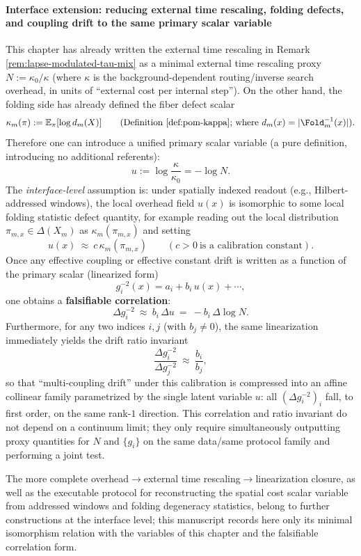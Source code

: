 \paragraph{Interface extension: reducing external time rescaling, folding defects, and coupling drift to the same primary scalar variable}
This chapter has already written the external time rescaling in Remark \ref{rem:lapse-modulated-tau-mix} as a minimal external time rescaling proxy
\(
N:=\kappa_0/\kappa
\)
(where \(\kappa\) is the background-dependent routing/inverse search overhead, in units of ``external cost per internal step'').
On the other hand, the folding side has already defined the fiber defect scalar
\begin{equation}\label{eq:gut_kappa_m_defect}
\kappa_m(\pi):=\mathbb{E}_{\pi}[\log d_m(X)]
\qquad(\text{Definition \ref{def:pom-kappa}; where }d_m(x)=|\Fold_m^{-1}(x)|).
\end{equation}
Therefore one can introduce a unified primary scalar variable (a pure definition, introducing no additional referents):
\[
u:=\log\frac{\kappa}{\kappa_0}=-\log N.
\]
The \emph{interface-level} assumption is: under spatially indexed readout (e.g., Hilbert-addressed windows), the local overhead field \(u(x)\) is isomorphic to some local folding statistic defect quantity,
for example reading out the local distribution \(\pi_{m,x}\in\Delta(X_m)\) as
\(
\kappa_m(\pi_{m,x})
\)
and setting
\[
u(x)\ \approx\ c\,\kappa_m(\pi_{m,x})
\qquad(c>0\ \text{is a calibration constant}).
\]
Once any effective coupling or effective constant drift is written as a function of the primary scalar (linearized form)
\[
g_i^{-2}(x)=a_i+b_i\,u(x)+\cdots,
\]
one obtains a \textbf{falsifiable correlation}:
\[
\Delta g_i^{-2}\ \approx\ b_i\,\Delta u\ =\ -b_i\,\Delta\log N.
\]
Furthermore, for any two indices \(i,j\) (with \(b_j\neq 0\)), the same linearization immediately yields the drift ratio invariant
\[
\frac{\Delta g_i^{-2}}{\Delta g_j^{-2}}\ \approx\ \frac{b_i}{b_j},
\]
so that ``multi-coupling drift'' under this calibration is compressed into an affine collinear family parametrized by the single latent variable \(u\): all \((\Delta g_i^{-2})_i\) fall, to first order, on the same rank-\(1\) direction.
This correlation and ratio invariant do not depend on a continuum limit; they only require simultaneously outputting proxy quantities for \(N\) and \(\{g_i\}\) on the same data/same protocol family and performing a joint test.
\par
The more complete overhead\(\to\)external time rescaling\(\to\)linearization closure, as well as the executable protocol for reconstructing the spatial cost scalar variable from addressed windows and folding degeneracy statistics, belong to further constructions at the interface level;
this manuscript records here only its minimal isomorphism relation with the variables of this chapter and the falsifiable correlation form.


